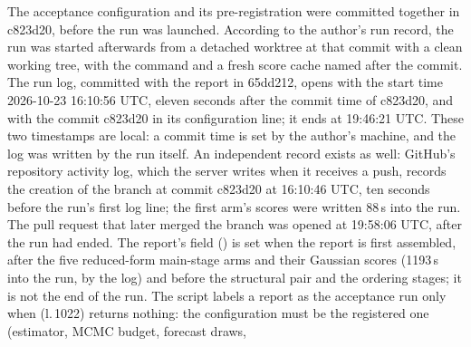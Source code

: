 The acceptance configuration and its pre-registration were committed together in c823d20, before the
run was launched.
According to the author's run record, the run was started afterwards from a detached worktree at
that commit with a clean working tree,
with the command 
   and a fresh score cache named after the commit.
The run log, committed with the report in 65dd212, opens with the start time 2026-10-23 16:10:56 UTC,
eleven seconds after the commit time of c823d20, and with the commit c823d20 in its configuration line;
it ends at 19:46:21 UTC.
These two timestamps are local: a commit time is set by the author's machine, and the log was
written by the run itself. An independent record exists as well: GitHub's repository activity log,
which the server writes when it receives a push, records the creation of the branch
 at commit c823d20 at 16:10:46 UTC, ten seconds before the run's first
log line; the first arm's scores were written 88\,s into the run. The pull request that later
merged the branch was opened at 19:58:06 UTC, after the run had ended.
The report's  field () is set when the report is first assembled,
after the five reduced-form main-stage arms and their Gaussian scores (1193\,s into the run, by the
log) and before the structural pair and the ordering stages; it is not the end of the run.
The script labels a report as the acceptance run only when  (l.\,1022) returns
nothing: the configuration must be the registered one (estimator, MCMC budget, forecast draws,
